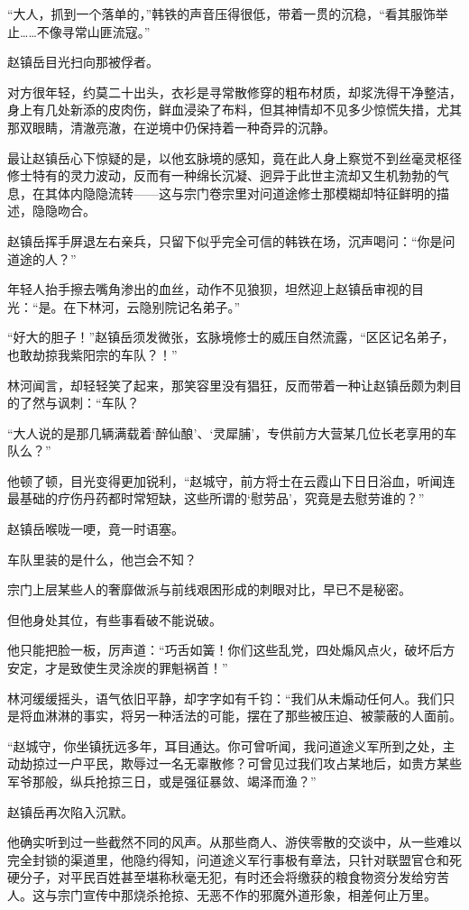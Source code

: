 “大人，抓到一个落单的，”韩铁的声音压得很低，带着一贯的沉稳，“看其服饰举止……不像寻常山匪流寇。”

赵镇岳目光扫向那被俘者。

对方很年轻，约莫二十出头，衣衫是寻常散修穿的粗布材质，却浆洗得干净整洁，身上有几处新添的皮肉伤，鲜血浸染了布料，但其神情却不见多少惊慌失措，尤其那双眼睛，清澈亮澈，在逆境中仍保持着一种奇异的沉静。

最让赵镇岳心下惊疑的是，以他玄脉境的感知，竟在此人身上察觉不到丝毫灵枢径修士特有的灵力波动，反而有一种绵长沉凝、迥异于此世主流却又生机勃勃的气息，在其体内隐隐流转——这与宗门卷宗里对问道途修士那模糊却特征鲜明的描述，隐隐吻合。

赵镇岳挥手屏退左右亲兵，只留下似乎完全可信的韩铁在场，沉声喝问：“你是问道途的人？”

年轻人抬手擦去嘴角渗出的血丝，动作不见狼狈，坦然迎上赵镇岳审视的目光：“是。在下林河，云隐别院记名弟子。”

“好大的胆子！”赵镇岳须发微张，玄脉境修士的威压自然流露，“区区记名弟子，也敢劫掠我紫阳宗的车队？！”

林河闻言，却轻轻笑了起来，那笑容里没有猖狂，反而带着一种让赵镇岳颇为刺目的了然与讽刺：“车队？

“大人说的是那几辆满载着‘醉仙酿’、‘灵犀脯’，专供前方大营某几位长老享用的车队么？”

他顿了顿，目光变得更加锐利，“赵城守，前方将士在云霞山下日日浴血，听闻连最基础的疗伤丹药都时常短缺，这些所谓的‘慰劳品’，究竟是去慰劳谁的？”

赵镇岳喉咙一哽，竟一时语塞。

车队里装的是什么，他岂会不知？

宗门上层某些人的奢靡做派与前线艰困形成的刺眼对比，早已不是秘密。

但他身处其位，有些事看破不能说破。

他只能把脸一板，厉声道：“巧舌如簧！你们这些乱党，四处煽风点火，破坏后方安定，才是致使生灵涂炭的罪魁祸首！”

林河缓缓摇头，语气依旧平静，却字字如有千钧：“我们从未煽动任何人。我们只是将血淋淋的事实，将另一种活法的可能，摆在了那些被压迫、被蒙蔽的人面前。

“赵城守，你坐镇抚远多年，耳目通达。你可曾听闻，我问道途义军所到之处，主动劫掠过一户平民，欺辱过一名无辜散修？可曾见过我们攻占某地后，如贵方某些军爷那般，纵兵抢掠三日，或是强征暴敛、竭泽而渔？”

赵镇岳再次陷入沉默。

他确实听到过一些截然不同的风声。从那些商人、游侠零散的交谈中，从一些难以完全封锁的渠道里，他隐约得知，问道途义军行事极有章法，只针对联盟官仓和死硬分子，对平民百姓甚至堪称秋毫无犯，有时还会将缴获的粮食物资分发给穷苦人。这与宗门宣传中那烧杀抢掠、无恶不作的邪魔外道形象，相差何止万里。

